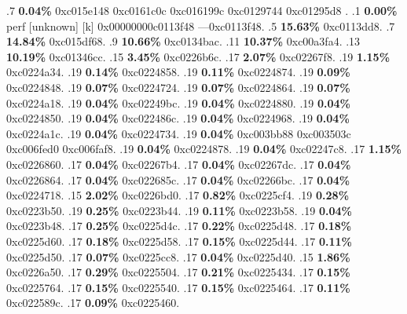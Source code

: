\begin{profile}
{.7 \textbf{0.04\%} 0xc015e148\newline {} 0xc0161c0c\newline {} 0xc016199c\newline {} 0xc0129744\newline {} 0xc01295d8\newline {} . 
.1 \textbf{ 0.00\%} perf             [unknown]              [k] 0x00000000c0113f48\newline {} ---0xc0113f48. 
.5 \textbf{15.63\%} 0xc0113dd8. 
.7 \textbf{14.84\%} 0xc015df68. 
.9 \textbf{10.66\%} 0xc0134bac. 
.11 \textbf{10.37\%} 0xc00a3fa4. 
.13 \textbf{10.19\%} 0xc01346cc. 
.15 \textbf{3.45\%} 0xc0226b6c. 
.17 \textbf{2.07\%} 0xc02267f8. 
.19 \textbf{1.15\%} 0xc0224a34. 
.19 \textbf{0.14\%} 0xc0224858. 
.19 \textbf{0.11\%} 0xc0224874. 
.19 \textbf{0.09\%} 0xc0224848. 
.19 \textbf{0.07\%} 0xc0224724. 
.19 \textbf{0.07\%} 0xc0224864. 
.19 \textbf{0.07\%} 0xc0224a18. 
.19 \textbf{0.04\%} 0xc02249bc. 
.19 \textbf{0.04\%} 0xc0224880. 
.19 \textbf{0.04\%} 0xc0224850. 
.19 \textbf{0.04\%} 0xc022486c. 
.19 \textbf{0.04\%} 0xc0224968. 
.19 \textbf{0.04\%} 0xc0224a1c. 
.19 \textbf{0.04\%} 0xc0224734. 
.19 \textbf{0.04\%} 0xc003bb88\newline {} 0xc003503c\newline {} 0xc006fed0\newline {} 0xc006faf8. 
.19 \textbf{0.04\%} 0xc0224878. 
.19 \textbf{0.04\%} 0xc02247c8. 
.17 \textbf{1.15\%} 0xc0226860. 
.17 \textbf{0.04\%} 0xc02267b4. 
.17 \textbf{0.04\%} 0xc02267dc. 
.17 \textbf{0.04\%} 0xc0226864. 
.17 \textbf{0.04\%} 0xc022685c. 
.17 \textbf{0.04\%} 0xc02266bc. 
.17 \textbf{0.04\%} 0xc0224718. 
.15 \textbf{2.02\%} 0xc0226bd0. 
.17 \textbf{0.82\%} 0xc0225cf4. 
.19 \textbf{0.28\%} 0xc0223b50. 
.19 \textbf{0.25\%} 0xc0223b44. 
.19 \textbf{0.11\%} 0xc0223b58. 
.19 \textbf{0.04\%} 0xc0223b48. 
.17 \textbf{0.25\%} 0xc0225d4c. 
.17 \textbf{0.22\%} 0xc0225d48. 
.17 \textbf{0.18\%} 0xc0225d60. 
.17 \textbf{0.18\%} 0xc0225d58. 
.17 \textbf{0.15\%} 0xc0225d44. 
.17 \textbf{0.11\%} 0xc0225d50. 
.17 \textbf{0.07\%} 0xc0225cc8. 
.17 \textbf{0.04\%} 0xc0225d40. 
.15 \textbf{1.86\%} 0xc0226a50. 
.17 \textbf{0.29\%} 0xc0225504. 
.17 \textbf{0.21\%} 0xc0225434. 
.17 \textbf{0.15\%} 0xc0225764. 
.17 \textbf{0.15\%} 0xc0225540. 
.17 \textbf{0.15\%} 0xc0225464. 
.17 \textbf{0.11\%} 0xc022589c. 
.17 \textbf{0.09\%} 0xc0225460. 
}
\end{profile}
